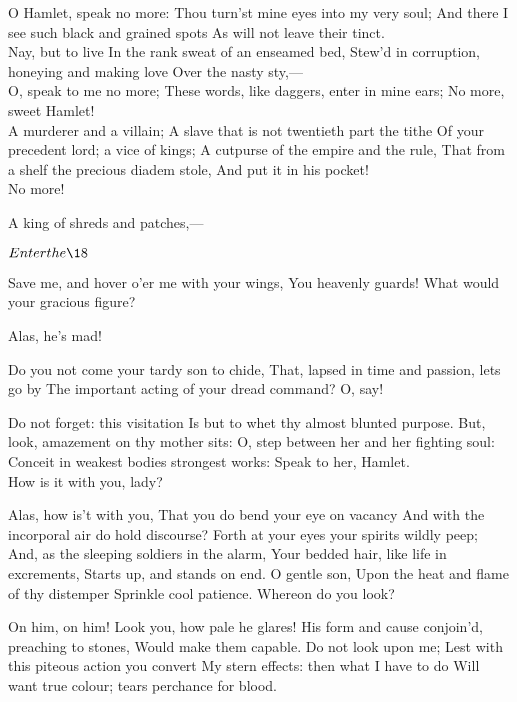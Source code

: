 \documentclass[11pt]{book}
\begin{document}
\3	O Hamlet, speak no more:
	Thou turn'st mine eyes into my very soul;
	And there I see such black and grained spots
	As will not leave their tinct. \\

\1	Nay, but to live
	In the rank sweat of an enseamed bed,
	Stew'd in corruption, honeying and making love
	Over the nasty sty,--- \\

\3	O, speak to me no more;
	These words, like daggers, enter in mine ears;
	No more, sweet Hamlet! \\

\1	A murderer and a villain;
	A slave that is not twentieth part the tithe
	Of your precedent lord; a vice of kings;
	A cutpurse of the empire and the rule,
	That from a shelf the precious diadem stole,
	And put it in his pocket! \\

\3	No more!

\1	A king of shreds and patches,---

	\(Enter the \18\)

	Save me, and hover o'er me with your wings,
	You heavenly guards! What would your gracious figure?

\3	Alas, he's mad!

\1	Do you not come your tardy son to chide,
	That, lapsed in time and passion, lets go by
	The important acting of your dread command? O, say!

	Do not forget: this visitation
	Is but to whet thy almost blunted purpose.
	But, look, amazement on thy mother sits:
	O, step between her and her fighting soul:
	Conceit in weakest bodies strongest works:
	Speak to her, Hamlet. \\

\1	How is it with you, lady?

\3	Alas, how is't with you,
	That you do bend your eye on vacancy
	And with the incorporal air do hold discourse?
	Forth at your eyes your spirits wildly peep;
	And, as the sleeping soldiers in the alarm,
	Your bedded hair, like life in excrements,
	Starts up, and stands on end. O gentle son,
	Upon the heat and flame of thy distemper
	Sprinkle cool patience. Whereon do you look?

\1	On him, on him! Look you, how pale he glares!
	His form and cause conjoin'd, preaching to stones,
	Would make them capable. Do not look upon me;
	Lest with this piteous action you convert
	My stern effects: then what I have to do
	Will want true colour; tears perchance for blood.
\end{document}
